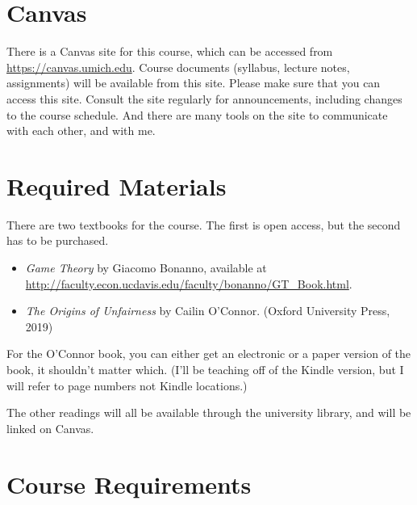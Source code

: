 \documentclass[
]{article}
\providecommand{\tightlist}{%
  \setlength{\itemsep}{0pt}\setlength{\parskip}{0pt}}
\begin{document}
\hypertarget{canvas}{%
\section{Canvas}\label{canvas}}

There is a Canvas site for this course, which can be accessed from
\url{https://canvas.umich.edu}. Course documents (syllabus, lecture
notes, assignments) will be available from this site. Please make sure
that you can access this site. Consult the site regularly for
announcements, including changes to the course schedule. And there are
many tools on the site to communicate with each other, and with me.

\hypertarget{required-materials}{%
\section{Required Materials}\label{required-materials}}

There are two textbooks for the course. The first is open access, but
the second has to be purchased.

\begin{itemize}
\tightlist
\item
  \emph{Game Theory} by Giacomo Bonanno, available at
  \url{http://faculty.econ.ucdavis.edu/faculty/bonanno/GT_Book.html}.
\item
  \emph{The Origins of Unfairness} by Cailin O'Connor. (Oxford
  University Press, 2019)
\end{itemize}

For the O'Connor book, you can either get an electronic or a paper
version of the book, it shouldn't matter which. (I'll be teaching off of
the Kindle version, but I will refer to page numbers not Kindle
locations.)

The other readings will all be available through the university library,
and will be linked on Canvas.

\newpage

\hypertarget{course-requirements}{%
\section{Course Requirements}\label{course-requirements}}
\end{document}
